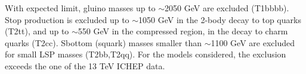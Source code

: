 
\newpage
With expected limit, gluino masses up to $\sim$2050 GeV are excluded (T1bbbb). Stop production is
excluded up to $\sim$1050 GeV in the 2-body decay to top quarks (T2tt), and up
to $\sim$550 GeV in the compressed region, in the decay to charm quarks (T2cc).
Sbottom (squark) masses smaller than $\sim$1100 GeV are excluded for small LSP
masses (T2bb,T2qq). For the models considered, the exclusion exceeds the one of
the 13 TeV ICHEP data.

